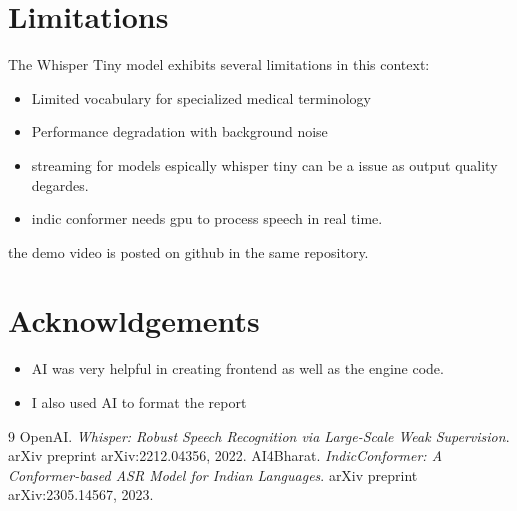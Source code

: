 \documentclass[11pt,a4paper]{article}
\begin{document}
\section{Limitations}

The Whisper Tiny model exhibits several limitations in this context:
\begin{itemize}
    \item Limited vocabulary for specialized medical terminology
    \item Performance degradation with background noise
    \item streaming for models espically whisper tiny can be a issue as output quality degardes. 
    \item indic conformer needs gpu to process speech in real time.
\end{itemize}


\item the demo video is posted on github in the same repository.




\section{Acknowldgements} 
\begin{itemize}
\item AI was very helpful in creating frontend as well as the engine code. 
\item I also used AI to format the report
\end{itemize}

\begin{thebibliography}{9}
 OpenAI. \textit{Whisper: Robust Speech Recognition via Large-Scale Weak Supervision}. arXiv preprint arXiv:2212.04356, 2022.
 AI4Bharat. \textit{IndicConformer: A Conformer-based ASR Model for Indian Languages}. arXiv preprint arXiv:2305.14567, 2023.

\end{thebibliography}
\end{document}
